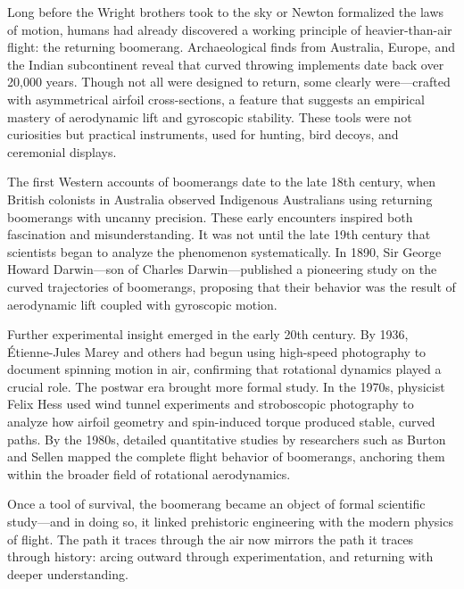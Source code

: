 \begin{historical}
Long before the Wright brothers took to the sky or Newton formalized the laws of motion, humans had already discovered a working principle of heavier-than-air flight: the returning boomerang. Archaeological finds from Australia, Europe, and the Indian subcontinent reveal that curved throwing implements date back over 20,000 years. Though not all were designed to return, some clearly were—crafted with asymmetrical airfoil cross-sections, a feature that suggests an empirical mastery of aerodynamic lift and gyroscopic stability. These tools were not curiosities but practical instruments, used for hunting, bird decoys, and ceremonial displays.

The first Western accounts of boomerangs date to the late 18th century, when British colonists in Australia observed Indigenous Australians using returning boomerangs with uncanny precision. These early encounters inspired both fascination and misunderstanding. It was not until the late 19th century that scientists began to analyze the phenomenon systematically. In 1890, Sir George Howard Darwin—son of Charles Darwin—published a pioneering study on the curved trajectories of boomerangs, proposing that their behavior was the result of aerodynamic lift coupled with gyroscopic motion.

Further experimental insight emerged in the early 20th century. By 1936, Étienne-Jules Marey and others had begun using high-speed photography to document spinning motion in air, confirming that rotational dynamics played a crucial role. The postwar era brought more formal study. In the 1970s, physicist Felix Hess used wind tunnel experiments and stroboscopic photography to analyze how airfoil geometry and spin-induced torque produced stable, curved paths. By the 1980s, detailed quantitative studies by researchers such as Burton and Sellen mapped the complete flight behavior of boomerangs, anchoring them within the broader field of rotational aerodynamics.

Once a tool of survival, the boomerang became an object of formal scientific study—and in doing so, it linked prehistoric engineering with the modern physics of flight. The path it traces through the air now mirrors the path it traces through history: arcing outward through experimentation, and returning with deeper understanding.
\end{historical}
